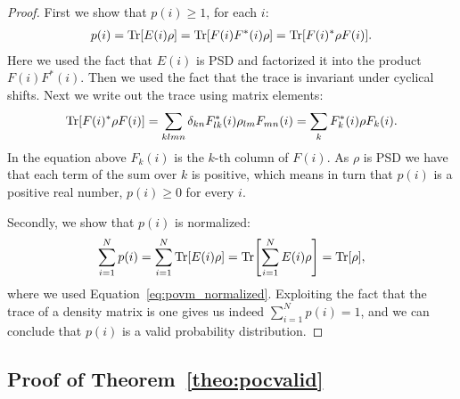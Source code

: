 \proppovmprob*
\begin{proof}
	First we show that $p(i)\geq 1$, for each $i$:
	\begin{align}
		p(i)
		=
		\Tr [ E(i) \rho ]
		=
		\Tr [ F(i) F^*(i)  \rho ]
		=
		\Tr [ F(i)^*  \rho F(i) ].
	\end{align}
	Here we used the fact that $E(i)$ is PSD and factorized it into the product $F(i) F^*(i)$. Then we used the fact that the trace is invariant under cyclical shifts. Next we write out the trace using matrix elements:
	\begin{align}
		\Tr [ F(i)^*  \rho F(i)]
		=
		\sum_{klmn}  \delta_{kn} F^*_{lk}(i)\rho_{lm} F_{mn}(i)
		=
		\sum_{k}   F^*_{k}(i)\rho F_{k}(i).
		\label{eq:proof:trpsdprod}
	\end{align}
	In the equation above $F_{k}(i)$ is the $k$-th column of $F(i)$. As $\rho$ is PSD we have that each term of the sum over $k$ is positive, which means in turn that $p(i)$ is a positive real number, \ie $p(i){\geq} 0$ for every $i$.

	Secondly, we show that $p(i)$ is normalized:
	\begin{align}
		\sum_{i=1}^N p(i)
		=
		\sum_{i=1}^N \Tr [ E(i) \rho ]
		=
		\Tr [ \sum_{i=1}^N E(i) \rho ]
		=
		\Tr [  \rho ],
	\end{align}
	where we used Equation~\ref{eq:povm_normalized}.
	Exploiting the fact that the trace of a density matrix is one gives us indeed $\sum_{i=1}^N p(i)=1$, and we can conclude that $p(i)$ is a valid probability distribution.
\end{proof}









\subsection{Proof of Theorem~\ref{theo:pocvalid}}
\label{sec:proof:pocvalid}


\theopocvalid*









